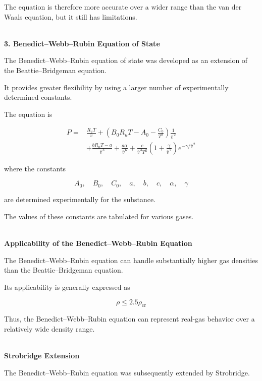 \documentclass[12pt]{article}
\begin{document}
The equation is therefore more accurate over a wider range than the van der Waals equation, but it still has limitations.

\textbf{\\ 3. Benedict--Webb--Rubin Equation of State}

The Benedict--Webb--Rubin equation of state was developed as an extension of the Beattie--Bridgeman equation.

It provides greater flexibility by using a larger number of experimentally determined constants.

The equation is

\begin{equation*}
\boxed{
\begin{aligned}
P={}&
\frac{R_uT}{\bar{v}}
+
\left(
B_0R_uT-A_0-\frac{C_0}{T^2}
\right)\frac{1}{\bar{v}^{\,2}}
\\
&+
\frac{bR_uT-a}{\bar{v}^{\,3}}
+
\frac{a\alpha}{\bar{v}^{\,6}}
+
\frac{c}{\bar{v}^{\,3}T^2}
\left(
1+\frac{\gamma}{\bar{v}^{\,2}}
\right)
e^{-\gamma/\bar{v}^{\,2}}
\end{aligned}
}
\end{equation*}

where the constants

\begin{equation*}
A_0,\quad B_0,\quad C_0,\quad a,\quad b,\quad c,\quad \alpha,\quad \gamma
\end{equation*}

are determined experimentally for the substance.

The values of these constants are tabulated for various gases.

\textbf{\\ Applicability of the Benedict--Webb--Rubin Equation}

The Benedict--Webb--Rubin equation can handle substantially higher gas densities than the Beattie--Bridgeman equation.

Its applicability is generally expressed as

\begin{equation*}
\boxed{
\rho\leq2.5\rho_{\mathrm{cr}}
}
\end{equation*}

Thus, the Benedict--Webb--Rubin equation can represent real-gas behavior over a relatively wide density range.

\textbf{\\ Strobridge Extension}

The Benedict--Webb--Rubin equation was subsequently extended by Strobridge.
\end{document}

